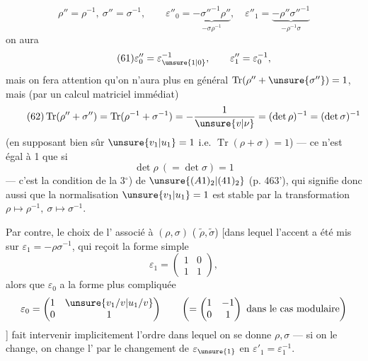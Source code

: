 


\[
\tag{60}
\rho''=\rho^{-1},\ \sigma''=\sigma^{-1},\qquad
\varepsilon''_0=\underbrace{-\sigma''^{-1}\rho''}_{-\sigma\rho^{-1}},\quad
\varepsilon''_1=\underbrace{-\rho''\sigma''^{-1}}_{-\rho^{-1}\sigma}
\]
on aura
\[
\tag{61}
\varepsilon''_0=\varepsilon_{\unsure{1|0}}^{-1},\qquad
\varepsilon''_1=\varepsilon_0^{-1},
\]
mais on fera attention qu'on n'aura plus en général $\operatorname{Tr}(\rho''+\unsure{\sigma''})=1$, mais (par un calcul matriciel immédiat)
\[
\tag{62}
\operatorname{Tr}(\rho''+\sigma'')
=\operatorname{Tr}(\rho^{-1}+\sigma^{-1})
=-\frac{1}{\unsure{v|\nu}}
=(\det\rho)^{-1}=(\det\sigma)^{-1}
\]
(en supposant bien sûr  $\unsure{v_1|u_1}=1$ i.e. $\operatorname{Tr}(\rho+\sigma)=1$)
--- ce n'est égal à 1 que si
\[
\tag{63}
\det\rho\ (=\det\sigma)=1
\]
--- c'est la condition de la  3$^\circ$) de $\unsure{(A1)_2|(41)_2}$ (p. 463'), qui signifie donc aussi que la normalisation $\unsure{v_1|u_1}=1$ est stable par la transformation $\rho\mapsto\rho^{-1},\ \sigma\mapsto\sigma^{-1}$.

Par contre, le choix de l'\uline{} associé à $(\rho,\sigma)$ ( $\widetilde\rho,\widetilde\sigma$) [dans lequel l'accent a été mis sur $\varepsilon_1=-\rho\sigma^{-1}$, qui reçoit la forme simple
\[
\varepsilon_1=\begin{pmatrix}1&0\\1&1\end{pmatrix},
\]
alors que $\varepsilon_0$  a la forme plus compliquée
\[
\varepsilon_0=\begin{pmatrix}1&\unsure{v_1/v|u_1/v}\\0&1\end{pmatrix}
\qquad\left(=\begin{pmatrix}1&-1\\0&1\end{pmatrix}\text{ dans le cas modulaire}\right)
\]
] fait intervenir implicitement l'ordre dans lequel on se donne $\rho,\sigma$ --- si on le change, on change l' par le changement de $\varepsilon_{\unsure{1}}$ en $\varepsilon'_1=\varepsilon_1^{-1}$.

